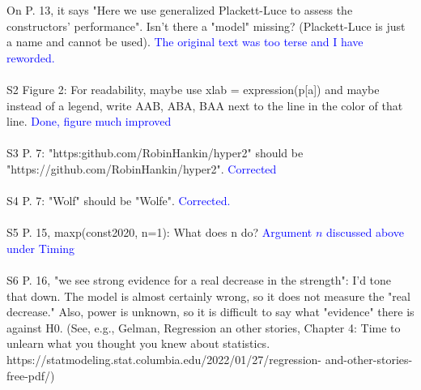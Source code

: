 \documentclass[12pt]{article}
\begin{document}
On P. 13, it says "Here we use generalized Plackett-Luce to assess the
constructors' performance". Isn't there a "model" missing?
(Plackett-Luce is just a name and cannot be used).
\textcolor{blue}{The original text was too terse and I have
  reworded.}\\ \\


S2 Figure 2: For readability, maybe use xlab = expression(p[a]) and maybe
instead of a legend, write AAB, ABA, BAA next to the line in the color
of that line.
\textcolor{blue}{Done, figure much improved}\\ \\


S3 P. 7: "https:github.com/RobinHankin/hyper2" should be
"https://github.com/RobinHankin/hyper2".
\textcolor{blue}{Corrected}\\ \\


S4 P. 7: "Wolf" should be "Wolfe".
\textcolor{blue}{Corrected.}\\ \\


S5 P. 15, maxp(const2020, n=1): What does n do?
\textcolor{blue}{Argument $n$ discussed above under Timing}\\ \\

S6 P. 16, "we see strong evidence for a real decrease in the strength": I'd tone
that down. The model is almost certainly wrong, so it does not measure
the "real decrease." Also, power is unknown, so it is difficult to say what
"evidence" there is against H0. (See, e.g., Gelman, Regression an other
stories, Chapter 4: Time to unlearn what you thought you knew about
statistics. https://statmodeling.stat.columbia.edu/2022/01/27/regression-
and-other-stories-free-pdf/)\\
\end{document}
